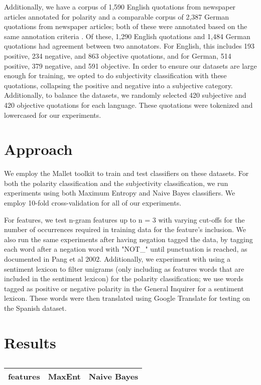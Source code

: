 \documentclass[11pt]{article}
\begin{document}
Additionally, we have a corpus of 1,590 English quotations from newspaper articles annotated for polarity and a comparable corpus of 2,387 German quotations from newspaper articles; both of these were annotated based on the same annotation criteria \cite{balahur2011}.  Of these, 1,290 English quotations and 1,484 German quotations had agreement between two annotators.  For English, this includes 193 positive, 234 negative, and 863 objective quotations, and for German, 514 positive, 379 negative, and 591 objective.  In order to ensure our datasets are large enough for training, we opted to do subjectivity classification with these quotations, collapsing the positive and negative into a subjective category.  Additionally, to balance the datasets, we randomly selected 420 subjective and 420 objective quotations for each language.  These quotations were tokenized and lowercased for our experiments.

\section{Approach}

We employ the Mallet toolkit to train and test classifiers on these datasets.  For both the polarity classification and the subjectivity classification, we run experiments using both Maximum Entropy and Naive Bayes classifiers.  We employ 10-fold cross-validation for all of our experiments.

For features, we test n-gram features up to n = 3 with varying cut-offs for the number of occurrences required in training data for the feature's inclusion.  We also run the same experiments after having negation tagged the data, by tagging each word after a negation word with "NOT_" until punctuation is reached, as documented in Pang et al 2002.  Additionally, we experiment with using a sentiment lexicon to filter unigrams (only including as features words that are included in the sentiment lexicon) for the polarity classification; we use words tagged as positive or negative polarity in the General Inquirer for a sentiment lexicon.  These words were then translated using Google Translate for testing on the Spanish dataset.

\section{Results}

\begin{table}[ht]
  \centering
  \caption{}
  \renewcommand{\arraystretch}{1.5}%
    \begin{tabular}{>{\centering\bfseries}m{.5in} >{\centering}m{1in} >{\centering\arraybackslash}m{1in} }
    \toprule
\textbf{features} & \textbf{MaxEnt} & \textbf{Naive Bayes} \\
    \midrule

    \bottomrule
  \end{tabular}
\end{table}
\end{document}
